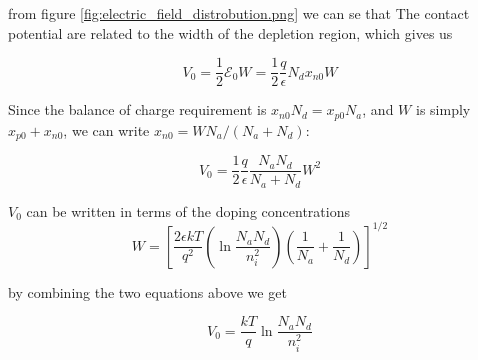 from figure \ref{fig:electric_field_distrobution.png} we can se that The contact potential are related to the width of the depletion region, which gives us

\[V_0=\frac{1}{2}\mathscr{E}_0W=\frac{1}{2}\frac{q}{\epsilon}N_dx_{n0}W\]

Since the balance of charge requirement is \( x_{n 0} N_{d}=x_{p 0} N_{a} \), and \( W \) is simply \( x_{p 0}+x_{n 0} \), we can write \( x_{n 0}=W N_{a} /\left(N_{a}+N_{d}\right) \):

\[V_{0}=\frac{1}{2} \frac{q}{\epsilon} \frac{N_{a} N_{d}}{N_{a}+N_{d}} W^{2}\]

\( V_{0} \) can be written in terms of the doping concentrations
\[W=\left[\frac{2 \epsilon k T}{q^{2}}\left(\ln \frac{N_{a} N_{d}}{n_{i}^{2}}\right)\left(\frac{1}{N_{a}}+\frac{1}{N_{d}}\right)\right]^{1 / 2}\]

by combining the two equations above we get

\[V_{0}=\frac{k T}{q} \ln \frac{N_{a} N_{d}}{n_{i}^{2}} \]